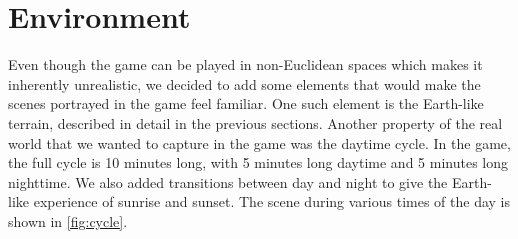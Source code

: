 \section{Environment}
Even though the game can be played in non-Euclidean spaces which makes it inherently unrealistic, we decided to add some elements that would make the scenes portrayed in the game feel familiar.
One such element is the Earth-like terrain, described in detail in the previous sections.
Another property of the real world that we wanted to capture in the game was the daytime cycle.
In the game, the full cycle is 10 minutes long, with 5 minutes long daytime and 5 minutes long nighttime.
We also added transitions between day and night to give the Earth-like experience of sunrise and sunset.
The scene during various times of the day is shown in \autoref{fig:cycle}.

